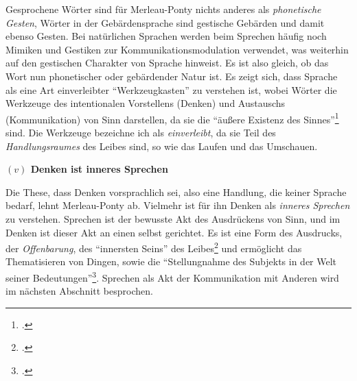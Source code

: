 \documentclass[a4paper, 12pt]{article}
\begin{document}
\begin{onehalfspace}
Gesprochene Wörter sind für Merleau-Ponty nichts anderes als \emph{phonetische Gesten}, Wörter in der Gebärdensprache sind gestische Gebärden und damit ebenso Gesten. Bei natürlichen Sprachen werden beim Sprechen häufig noch Mimiken und Gestiken zur Kommunikationsmodulation verwendet, was weiterhin auf den gestischen Charakter von Sprache hinweist. Es ist also gleich, ob das Wort nun  phonetischer oder gebärdender Natur ist. Es zeigt sich, dass Sprache als eine Art einverleibter "`Werkzeugkasten"' zu verstehen ist, wobei Wörter die Werkzeuge des intentionalen Vorstellens (Denken) und Austauschs (Kommunikation) von Sinn darstellen, da sie die "`äußere Existenz des Sinnes"'\footnote{\Cite[Siehe][S. 216]{merleau1966phanomenologie}.} sind. Die Werkzeuge bezeichne ich als \emph{einverleibt}, da sie Teil des \emph{Handlungsraumes} des Leibes sind, so wie das Laufen und das Umschauen.

\vspace{5mm}

\noindent\textbf{$(v)$ Denken ist inneres Sprechen}

\noindent Die These, dass Denken vorsprachlich sei, also eine Handlung, die keiner Sprache bedarf, lehnt Merleau-Ponty ab. Vielmehr ist für ihn Denken als \emph{inneres Sprechen} zu verstehen. Sprechen ist der bewusste Akt des Ausdrückens von Sinn, und im Denken ist dieser Akt an einen selbst gerichtet. Es ist eine Form des Ausdrucks, der \emph{Offenbarung}, des "`innersten Seins"' des Leibes\footnote{\Cite[Vgl.][S. 232]{merleau1966phanomenologie}.} und ermöglicht das Thematisieren von Dingen, sowie die "`Stellungnahme des Subjekts in der Welt seiner Bedeutungen"'\footnote{\Cite[Siehe][S. 229]{merleau1966phanomenologie}.}. Sprechen als Akt der Kommunikation mit Anderen wird im nächsten Abschnitt besprochen. 


\end{onehalfspace}
\end{document}
